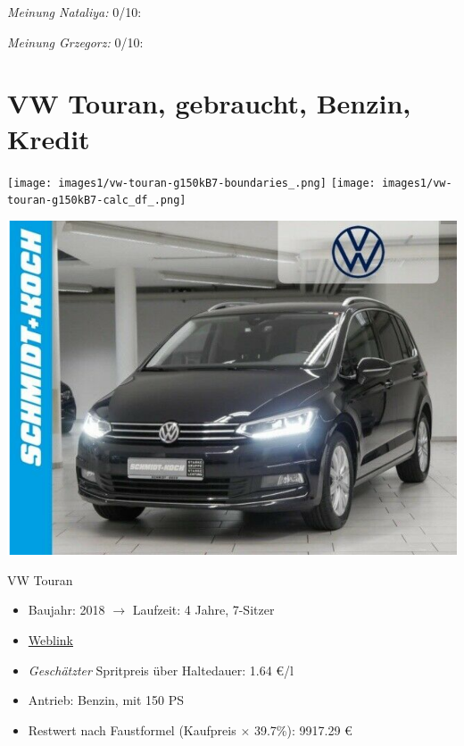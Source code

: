 \documentclass[landscape, DIV=99, 14pt]{scrartcl}
\begin{document}
\begin{small}
\emph{Meinung Nataliya:} 0/10: 
        
\emph{Meinung Grzegorz:} 0/10: 
\end{small}

\pagebreak


\twocolumn

\section*{VW Touran, gebraucht, Benzin, Kredit}
\begin{center}
\texttt{[image: images1/vw-touran-g150kB7-boundaries\_.png]}
\null
\vspace{0.5cm}
\texttt{[image: images1/vw-touran-g150kB7-calc\_df\_.png]}
\end{center}

\pagebreak
\begin{center}
\includegraphics[width=0.9\columnwidth]{cars/vw-touran-geb.png}

VW Touran
\end{center}

\begin{itemize}
    \item Baujahr: 2018 $\rightarrow$ Laufzeit: 4 Jahre, 7-Sitzer
    \item \href{https://suchen.mobile.de/fahrzeuge/details.html?id=338082714}{Weblink}
    \item \emph{Gesch\"atzter} Spritpreis \"uber Haltedauer: 1.64 \euro{}/l
    \item Antrieb: Benzin, mit 150 PS
    \item Restwert nach Faustformel (Kaufpreis $\times$ 39.7\%): 9917.29 \euro{}
\end{itemize}
\end{document}
